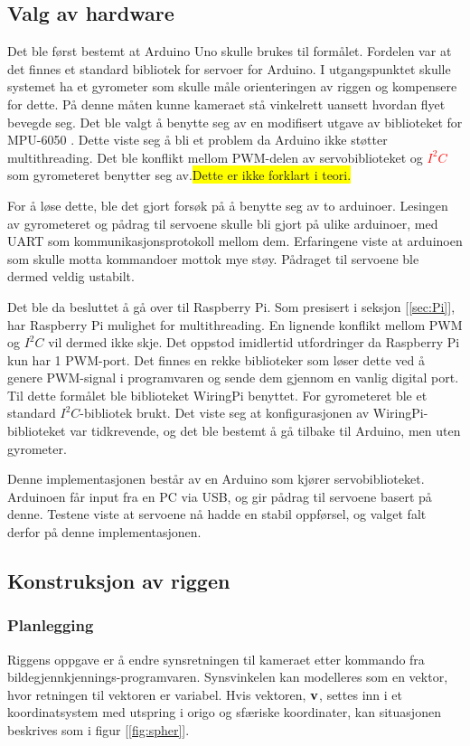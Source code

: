 \subsection{Valg av hardware}

Det ble først bestemt at Arduino Uno skulle brukes til formålet. Fordelen var at det finnes et standard bibliotek for servoer for Arduino. I utgangspunktet skulle systemet ha et gyrometer som skulle måle orienteringen av riggen og kompensere for dette. På denne måten kunne kameraet stå vinkelrett uansett hvordan flyet bevegde seg. Det ble valgt å benytte seg av en modifisert utgave av biblioteket for MPU-6050 \cite{GyroLib}. Dette viste seg å bli et problem da Arduino ikke støtter multithreading. Det ble konflikt mellom PWM-delen av servobiblioteket og \textcolor{red}{$I^2C$} som gyrometeret benytter seg av.\colorbox{yellow}{Dette er ikke forklart i teori.}

For å løse dette, ble det gjort forsøk på å benytte seg av to arduinoer. Lesingen av gyrometeret og pådrag til servoene skulle bli gjort på ulike arduinoer, med UART som kommunikasjonsprotokoll mellom dem. Erfaringene viste at arduinoen som skulle motta kommandoer mottok mye støy. Pådraget til servoene ble dermed veldig ustabilt.

Det ble da besluttet å gå over til Raspberry Pi. Som presisert i seksjon [\ref{sec:Pi}], har Raspberry Pi mulighet for multithreading. En lignende konflikt mellom PWM og $I^2C$ vil dermed ikke skje. Det oppstod imidlertid utfordringer da Raspberry Pi kun har 1 PWM-port. Det finnes en rekke biblioteker som løser dette ved å genere PWM-signal i programvaren og sende dem gjennom en vanlig digital port. Til dette formålet ble biblioteket WiringPi \cite{WirPi} benyttet. For gyrometeret ble et standard $I^2C$-bibliotek brukt. Det viste seg at konfigurasjonen av WiringPi-biblioteket var tidkrevende, og det ble bestemt å gå tilbake til Arduino, men uten gyrometer.

Denne implementasjonen består av en Arduino som kjører servobiblioteket. Arduinoen får input fra en PC via USB, og gir pådrag til servoene basert på denne. Testene viste at servoene nå hadde en stabil oppførsel, og valget falt derfor på denne implementasjonen.

\subsection{Konstruksjon av riggen}

\subsubsection{Planlegging}
Riggens oppgave er å endre synsretningen til kameraet etter kommando fra bildegjennkjennings-programvaren. Synsvinkelen kan modelleres som en vektor, hvor retningen til vektoren er variabel. Hvis vektoren, $\bf{v}$, settes inn i et koordinatsystem med utspring i origo og sfæriske koordinater, kan situasjonen beskrives som i figur [\ref{fig:spher}].

